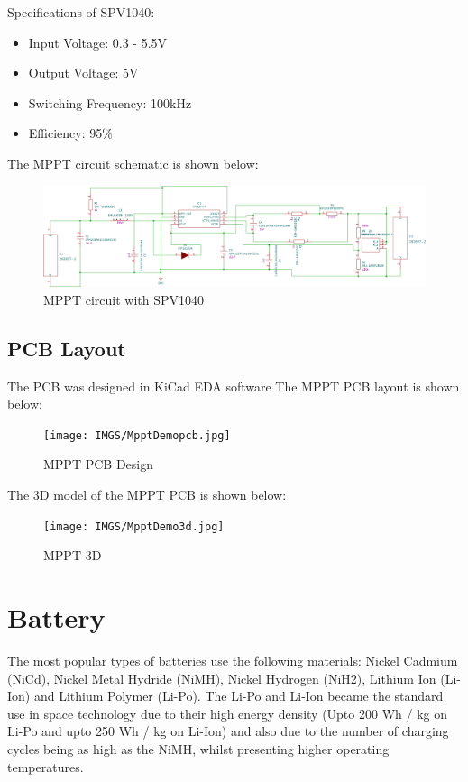 Specifications of  SPV1040:
	\begin{itemize}
	\item Input Voltage: 0.3 - 5.5V
	\item Output Voltage: 5V
	\item Switching Frequency: 100kHz
	\item Efficiency: 95\%
\end{itemize}
The MPPT circuit schematic is shown below:
 	\begin{figure}[h]
	\centering
	\includegraphics[width=\columnwidth]{IMGS/MpptDemoBoard.pdf}
	\caption{MPPT circuit with SPV1040}
	\label{fig:mpptsch}
\end{figure}
\subsection[mpptpcb]{PCB Layout}
The PCB was designed in KiCad EDA software
The MPPT PCB layout is shown below:
\begin{figure}[H]
	\centering
	\texttt{[image: IMGS/MpptDemopcb.jpg]}
	\caption{MPPT PCB Design}
	\label{fig:mpptpcb}
\end{figure}

The 3D model of the MPPT PCB is shown below:
\begin{figure}[H]
	\centering
	\texttt{[image: IMGS/MpptDemo3d.jpg]}
	\caption{MPPT 3D}
	\label{fig:mppt3d}
\end{figure}





\section[Battery]{Battery}
The most popular types of batteries use the following materials: Nickel Cadmium
(NiCd), Nickel Metal Hydride (NiMH), Nickel Hydrogen (NiH2), Lithium Ion
(Li-Ion) and Lithium Polymer (Li-Po). The Li-Po and Li-Ion became the standard use in space technology due to their
high energy density (Upto 200 Wh / kg on Li-Po and upto 250 Wh / kg on Li-Ion) and also due to
the number of charging cycles being as high as the NiMH, whilst presenting higher
operating temperatures. 
